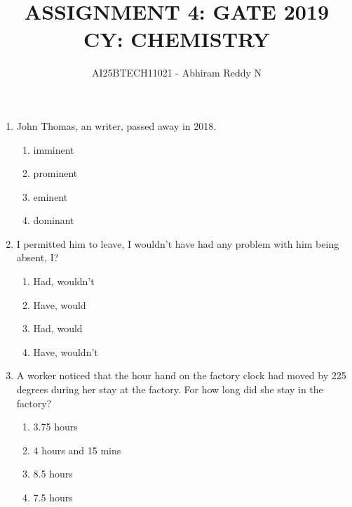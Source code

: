 \documentclass[journal,12pt,onecolumn]{IEEEtran}
\theoremstyle{remark}
\begin{document}
\title{
ASSIGNMENT 4: GATE 2019 \\
CY: CHEMISTRY}
\author{AI25BTECH11021 - Abhiram Reddy N}
\maketitle


\begin{enumerate} 





\item John Thomas, an \underline{\hspace{2cm}} writer, passed away in 2018.  \hfill{}

\begin{multicols}{4}
\begin{enumerate}
    \item imminent
    \item prominent
    \item eminent
    \item dominant
\end{enumerate}
\end{multicols}

\item \underline{\hspace{1.5cm}} I permitted him to leave, I wouldn't have had any problem with him being absent, \underline{\hspace{1.5cm}} I?  \hfill{}
\begin{multicols}{4}
\begin{enumerate}
    \item Had, wouldn't
    \item Have, would
    \item Had, would
    \item Have, wouldn't
\end{enumerate}
\end{multicols}

\item A worker noticed that the hour hand on the factory clock had moved by 225 degrees during her stay at the factory. For how long did she stay in the factory?  \hfill{}
\begin{multicols}{4}
\begin{enumerate}
    \item 3.75 hours
    \item 4 hours and 15 mins
    \item 8.5 hours
    \item 7.5 hours
\end{enumerate}
\end{multicols}


\end{enumerate}
\end{document}
